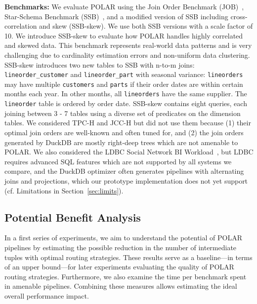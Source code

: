 \textbf{Benchmarks:} We evaluate POLAR using the Join Order Benchmark (JOB)~\cite{JoinOrderBenchmark}, Star-Schema Benchmark (SSB)~\cite{SSB-ONeil2009-qs}, and a modified version of SSB including cross-correlation and skew (SSB-skew). We use both SSB versions with a scale factor of 10.
%
We introduce SSB-skew to evaluate how POLAR handles highly correlated and skewed data. This benchmark represents real-world data patterns and is very challenging due to cardinality estimation errors and non-uniform data clustering. SSB-skew introduces two new tables to SSB with n-to-m joins: \texttt{lineorder\_customer} and \texttt{lineorder\_part} with seasonal variance: \texttt{lineorders} may have multiple \texttt{customers} and \texttt{parts} if their order dates are within certain months each year. In other months, all \texttt{lineorders} have the same supplier. The \texttt{lineorder} table is ordered by order date. SSB-skew contains eight queries, each joining between 3 - 7 tables using a diverse set of predicates on the dimension tables.  %
%
We considered TPC-H \cite{tpch} and JCC-H \cite{JCC-H} but did not use them because (1) their optimal join orders are well-known and often tuned for, and (2) the join orders generated by DuckDB are mostly right-deep trees which are not amenable to POLAR. We also considered the LDBC Social Network BI Workload~\cite{LDBC}, but LDBC requires advanced SQL features which are not supported by all systems we compare, and the DuckDB optimizer often generates pipelines with alternating joins and projections, which our prototype implementation does not yet support (cf. Limitations in Section~\ref{sec:limits}).
%

\subsection{Potential Benefit Analysis}
\label{sec:potential-analysis}

In a first series of experiments, we aim to understand the potential of POLAR pipelines by estimating the possible reduction in the number of intermediate tuples with optimal routing strategies. These results serve as a baseline---in terms of an upper bound---for later experiments evaluating the quality of POLAR routing strategies. Furthermore, we also examine the time per benchmark spent in amenable pipelines. Combining these measures allows estimating the ideal overall performance impact.

